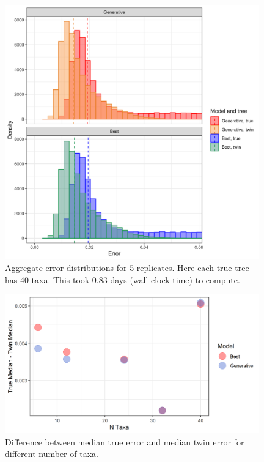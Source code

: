 \begin{figure}[H]
  \includegraphics[width=0.98\textwidth]{pirouette_example_42/errors.png}
  \caption{Aggregate error distributions for 5 replicates. Here each true tree has 40 taxa. This took 0.83 days (wall clock time) to compute.}
  \label{fig:example_40_taxa}
\end{figure}

\begin{figure}[H]
  \includegraphics[width=0.98\textwidth]{supplementary_figures/plot_error_vs_n_taxa.png}
  \caption{Difference between median true error and median twin error for different number of taxa.}
  \label{fig:error_vs_ntaxa}
\end{figure}

